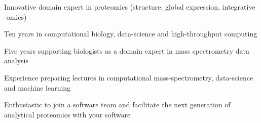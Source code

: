 


\begin{cventries}
\cventryshort
	{
	\begin{cvitems}
		\item Innovative domain expert in proteomics (structure, global expression, integrative -omics) 
		\item Ten years in computational biology, data-science and high-throughput computing
		\item Five years supporting biologists as a domain expert in mass spectrometry data analysis
		\item Experience preparing lectures in computational mass-spectrometry, data-science and machine learning
		\item Enthusiastic to join a software team and facilitate the next generation of analytical proteomics with your software
	\end{cvitems}
	}
\end{cventries}
